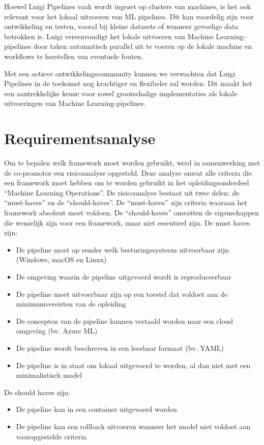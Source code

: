 Hoewel Luigi Pipelines vaak wordt ingezet op clusters van machines, is het ook relevant voor het lokaal uitvoeren van ML pipelines. Dit kan voordelig zijn voor ontwikkeling en testen, vooral bij kleine datasets of wanneer gevoelige data betrokken is. Luigi vereenvoudigt het lokale uitvoeren van Machine Learning-pipelines door taken automatisch parallel uit te voeren op de lokale machine en workflows te herstellen van eventuele fouten.

Met een actieve ontwikkelingscommunity kunnen we verwachten dat Luigi Pipelines in de toekomst nog krachtiger en flexibeler zal worden. Dit maakt het een aantrekkelijke keuze voor zowel grootschalige implementaties als lokale uitvoeringen van Machine Learning-pipelines.
\section{Requirementsanalyse}
Om te bepalen welk framework moet worden gebruikt, werd in samenwerking met de co-promotor een risicoanalyse opgesteld. Deze analyse omvat alle criteria die een framework moet hebben om te worden gebruikt in het opleidingsonderdeel ``Machine Learning Operations''.
De risicoanalyse bestaat uit twee delen: de ``must-haves'' en de ``should-haves''. De ``must-haves'' zijn criteria waaraan het framework absoluut moet voldoen. De ``should-haves'' omvatten de eigenschappen die wenselijk zijn voor een framework, maar niet essentieel zijn.
De must haves zijn:
\begin{itemize}
    \item De pipeline moet op eender welk besturingssysteem uitvoerbaar zijn (Windows, macOS en Linux)
    \item De omgeving waarin de pipeline uitgevoerd wordt is reproduceerbaar
    \item De pipeline moet uitvoerbaar zijn op een toestel dat voldoet aan de minimumvereisten van de opleiding
    \item De concepten van de pipeline kunnen vertaald worden naar een cloud omgeving (bv. Azure ML)
    \item De pipeline wordt beschreven in een leesbaar formaat (bv. YAML)
    \item De pipeline is in staat om lokaal uitgevoerd te worden, al dan niet met een minimalistisch model
\end{itemize}
De should haves zijn:
\begin{itemize}
    \item De pipeline kan in een container uitgevoerd worden
    \item De pipeline kan een rollback uitvoeren wanneer het model niet voldoet aan vooropgestelde criteria
\end{itemize}


